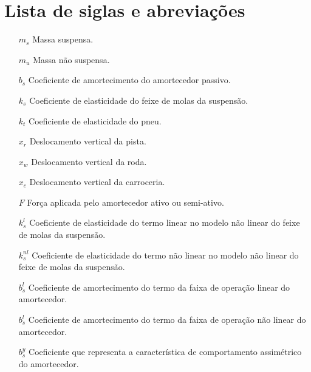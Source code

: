 \documentclass[a4paper]{ifacconf}
\begin{document}
    \section{Lista de siglas e abreviações}
    \begin{itemize} 
        \item [$m_s$] Massa suspensa.
        \item [$m_u$] Massa não suspensa.
        \item [$b_s$] Coeficiente de amortecimento do amortecedor passivo. 
        \item [$k_s$] Coeficiente de elasticidade do feixe de molas da suspensão.
        \item [$k_t$] Coeficiente de elasticidade do pneu.
        \item [$x_r$] Deslocamento vertical da pista.
        \item [$x_w$] Deslocamento vertical da roda.
        \item [$x_c$] Deslocamento vertical da carroceria.
        \item [$F$] Força aplicada pelo amortecedor ativo ou semi-ativo.
        \item [$k^{l}_{s}$] Coeficiente de elasticidade do termo linear no modelo não linear do feixe de molas da suspensão.
        \item [$k^{nl}_{s}$] Coeficiente de elasticidade do termo não linear no modelo não linear do feixe de molas da suspensão.
        \item [$b^{l}_{s}$] Coeficiente de amortecimento do termo da faixa de operação linear do amortecedor.
        \item [$b^{l}_{s}$] Coeficiente de amortecimento do termo da faixa de operação não linear do amortecedor.
        \item [$b^{y}_{s}$] Coeficiente que representa a característica  de comportamento assimétrico do amortecedor.
    \end{itemize}
    
\end{document}
